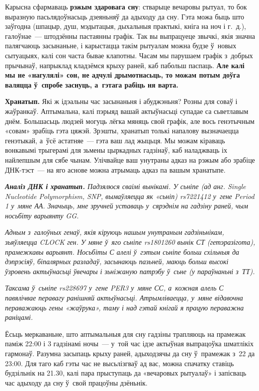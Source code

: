 Карысна сфармаваць \textbf{рэжым здаровага сну}: стварыце вечаровы рытуал, то бок выразную пасьлядоўнасьць дзеяньняў да адыходу да сну. Гэта можа быць што заўгодна (шпацыр, душ, мэдытацыя, дыхальныя практыкі, кніга на ноч і г.~д.), галоўнае~--- штодзённы пастаянны графік. Так вы выпрацуеце звычкі, якія значна палягчаюць засынаньне, і карыстацца такім рытуалам можна будзе ў~новых сытуацыях, калі сон часта бывае клапотны. Часам мы парушаем графік з~добрых прычынаў, напрыклад кладзёмся крыху раней, каб пабольш паспаць. \textbf{Але калі мы не «нагулялі» сон, не адчулі дрымотнасьць, то можам потым доўга валяцца ў~спробе заснуць, а~гэтага рабіць ня варта.}

\textbf{Хранатып.} Які ж ідэальны час засынаньня і абуджэньня? Розны для соваў і жаўранкаў. Аптымальна, калі пэрыяд вашай актыўнасьці супадае са сьветлавым днём. Большасьць людзей могуць лёгка мяняць свой графік, але вось генэтычным «совам» зрабіць гэта цяжэй. Зрэшты, хранатып толькі напалову вызначаецца генэтыкай, а~ўсё астатняе~--- гэта ваш лад жыцьця. Мы можам кіраваць вонкавымі трыгерамі для зьмены цыркадных гадзінаў, каб наладжваць іх найлепшым для сябе чынам. Улічвайце ваш унутраны адказ на рэжым або зрабіце ДНК-тэст~--- на яго аснове можна атрымаць адказ па вашым хранатыпе.

\emph{\textbf{Аналіз ДНК і хранатып.} Падзялюся сваімі вынікамі. У сьніпе (ад анг. Single Nucleotide Polymorphism, SNP, вымаўляецца як «сьніп) rs7221412 у~гене Period 1 у~мяне АА. Значыць, мне зручней уставаць у~сярэднім на гадзіну раней, чым носьбіту варыянту GG.}

\emph{Адным з~галоўных генаў, якія кіруюць нашым унутраным гадзіньнікам, зьяўляецца CLOCK ген. У мяне ў~яго сьніпе rs1801260 вынік СТ (гетэразігота), прамежкавы варыянт. Носьбіты С алелі ў~гэтым сьніпе больш схільныя да дэпрэсіяў, біпалярных разладаў, засынаюць пазьней, маюць больш высокі ўзровень актыўнасьці ўвечары і зьніжаную патрэбу ў~сьне (у параўнаньні з~ТТ).}

\emph{Таксама ў~сьніпе rs228697 у~гене PER3 у~мяне СС, а~кожная алель С павялічвае перавагу ранішняй актыўнасьці. Атрымліваецца, у~мяне відавочна пераважаюць гены «жаўрука», таму і над гэтай кнігай я працую пераважна раніцамі.}

Ёсьць меркаваньне, што аптымальныя для сну гадзіны трапляюць на прамежак паміж 22:00 і 3 гадзінамі ночы~--- у~той час ідзе актыўная выпрацоўка шматлікіх гармонаў. Разумна засыпаць крыху раней, адыходзячы да сну ў~прамежак з~22 да 23:00. Для таго каб гэты час не высьлізгваў ад вас, можна спачатку ставіць будзільнік на 21.30, калі пара прыступаць да «вечаровых рытуалаў» і запісваць час адыходу да сну ў~свой працоўны дзёньнік.

